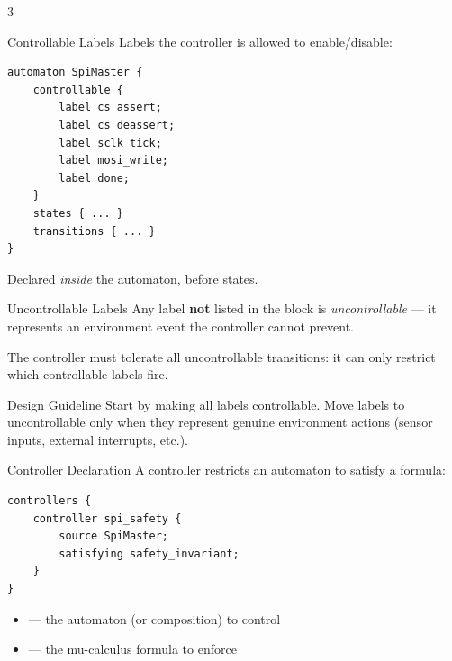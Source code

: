 



\begin{multicols}{3}
\footnotesize


\begin{cheatbox}{Controllable Labels}
Labels the controller is allowed to enable/disable:
\begin{lstlisting}[style=ctxdsl]
automaton SpiMaster {
    controllable {
        label cs_assert;
        label cs_deassert;
        label sclk_tick;
        label mosi_write;
        label done;
    }
    states { ... }
    transitions { ... }
}
\end{lstlisting}
Declared \emph{inside} the automaton, before states.
\end{cheatbox}

\begin{cheatbox}{Uncontrollable Labels}
Any label \textbf{not} listed in the  block is \emph{uncontrollable} --- it represents an environment event the controller cannot prevent.

\smallskip
The controller must tolerate all uncontrollable transitions: it can only restrict which controllable labels fire.
\end{cheatbox}

\begin{tipbox}{Design Guideline}
Start by making all labels controllable.  Move labels to uncontrollable only when they represent genuine environment actions (sensor inputs, external interrupts, etc.).
\end{tipbox}


\begin{cheatbox}{Controller Declaration}
A controller restricts an automaton to satisfy a formula:
\begin{lstlisting}[style=ctxdsl]
controllers {
    controller spi_safety {
        source SpiMaster;
        satisfying safety_invariant;
    }
}
\end{lstlisting}
\begin{itemize}
\item {} --- the automaton (or composition) to control
\item {} --- the mu-calculus formula to enforce
\end{itemize}
\end{cheatbox}


\end{multicols}

